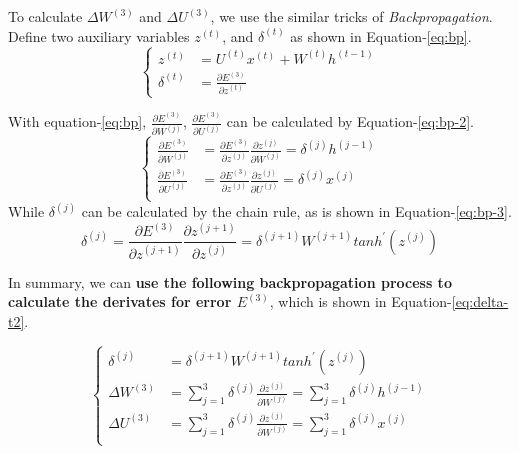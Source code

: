 \documentclass{article}
\begin{document}
 To calculate $\Delta W^{(3)}$ and $\Delta U^{(3)}$, we use the similar tricks of \textit{Backpropagation}. Define two auxiliary variables $z^{(t)}$, and  $\delta^{(t)}$ as shown in Equation-\ref{eq:bp}.
 \begin{equation}\label{eq:bp}\begin{cases}
 z^{(t)} &= U^{(t)} x^{(t)} + W^{(t)} h^{(t-1)}\\
 \delta^{(t)} &= \frac{\partial E^{(3)}}{\partial z^{(t)}}
 \end{cases}\end{equation}
 
 
 With equation-\ref{eq:bp},  $\frac{\partial E^{(3)}}{\partial W^{(j)}}$,  $\frac{\partial E^{(3)}}{\partial U^{(j)}}$  can be calculated by Equation-\ref{eq:bp-2}.
 \begin{equation}\label{eq:bp-2}\begin{cases}
 \frac{\partial E^{(3)}}{\partial W^{(j)}} &= \frac{\partial E^{(3)}}{\partial z^{(j)}} \frac{\partial z^{(j)}}{\partial W^{(j)}}  = \delta^{(j)} h^{(j-1)}\\
\frac{\partial E^{(3)}}{\partial U^{(j)}} &= \frac{\partial E^{(3)}}{\partial z^{(j)}} \frac{\partial z^{(j)}}{\partial U^{(j)}}  = \delta^{(j)} x^{(j)}\\
 \end{cases}\end{equation}
 While $\delta^{(j)}$ can be calculated by the chain rule, as is shown in Equation-\ref{eq:bp-3}.
 \begin{equation}\label{eq:bp-3}
  \delta^{(j)} = \frac{\partial E^{(3)}}{\partial z^{(j+1)}} \frac{\partial z^{(j+1)}}{\partial z^{(j)}} =\delta^{(j+1)} W^{(j+1)} tanh^{\prime}(z^{(j)})
 \end{equation}
 
 
 In summary,  we can \textbf{use the following backpropagation process to calculate the derivates for error $E^{(3)}$}, which is shown in 
 Equation-\ref{eq:delta-t2}.
 
 \begin{equation}\label{eq:delta-t2}\begin{cases}
 \delta^{(j)} &= \delta^{(j+1)} W^{(j+1)} tanh^{\prime}(z^{(j)}) \\
\Delta W^{(3)} &= {\sum\limits_{j=1}^3}\delta^{(j)}\frac{\partial z^{(j)}}{\partial W^{(j)}} = {\sum\limits_{j=1}^3}\delta^{(j)}h^{(j-1)}\\
\Delta U^{(3)} &= {\sum\limits_{j=1}^3}\delta^{(j)}\frac{\partial z^{(j)}}{\partial W^{(j)}} = {\sum\limits_{j=1}^3}\delta^{(j)}x^{(j)} \\
\end{cases}\end{equation}
\end{document}
